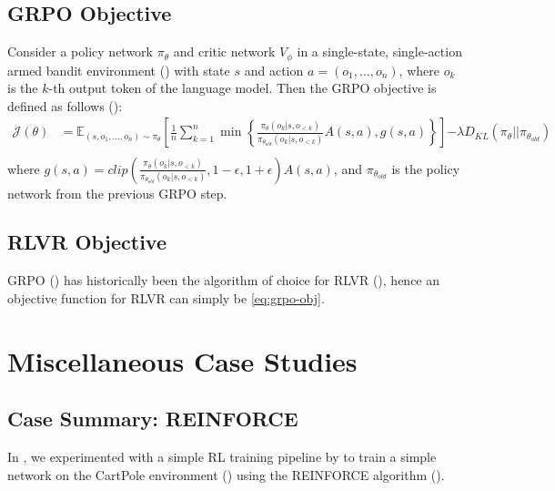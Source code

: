 \documentclass{article} %
\theoremstyle{definition}
\begin{document}
\subsection{GRPO Objective}
\label{sec:grpo-obj}

Consider a policy network $\pi_\theta$ and critic network $V_\phi$ in a single-state,
single-action armed bandit environment (\cite{Sutton-and-Barto-1998, contextualbandit}) 
with state $s$ and action $a = (o_1, \dots, o_n)$,
where $o_k$ is the $k$-th output token of the language model.
Then the GRPO objective is defined as follows (\cite{grpo, wk10}):
\begin{equation}
    \label{eq:grpo-obj}
    \begin{array}{rl}
        \mathcal{J}(\theta) &= \mathbb{E}_{(s, o_1, \dots, o_n) \sim \pi_\theta} \left[ 
            \displaystyle
            \frac{1}{n} \sum_{k = 1}^n \min \left\{
                \frac{\pi_\theta(o_k|s, o_{< k})}{\pi_{\theta_{old}}(o_k|s, o_{< k})} A(s, a),
                g(s, a)
            \right\}
        \right] {\displaystyle - \lambda D_{KL}(\pi_\theta || \pi_{\theta_{old}})} \\
    \end{array}
\end{equation}
where ${\displaystyle g(s, a) = clip\left(\frac{\pi_\theta(o_k|s, o_{< k})}{\pi_{\theta_{old}}(o_k|s, o_{< k})}, 1 - \epsilon, 1 + \epsilon \right) A(s, a)}$,
and $\pi_{\theta_{old}}$ is the policy network from the previous GRPO step.

\subsection{RLVR Objective}
\label{sec:rlvr-obj}

GRPO (\cite{grpo}) has historically been the algorithm of choice for RLVR (\cite{r1, grpo}),
hence an objective function for RLVR can simply be \ref{eq:grpo-obj}.

\section{Miscellaneous Case Studies}

\subsection{Case Summary: REINFORCE} \label{sec:cs-reinforce}
In \cite{wk3}, we experimented with a simple RL training pipeline by 
\cite{Levine-et-al-2023} to train a simple network on the CartPole environment (\cite{Towers-et-al-2024})
using the REINFORCE algorithm (\cite{Williams-1992}).
\end{document}
